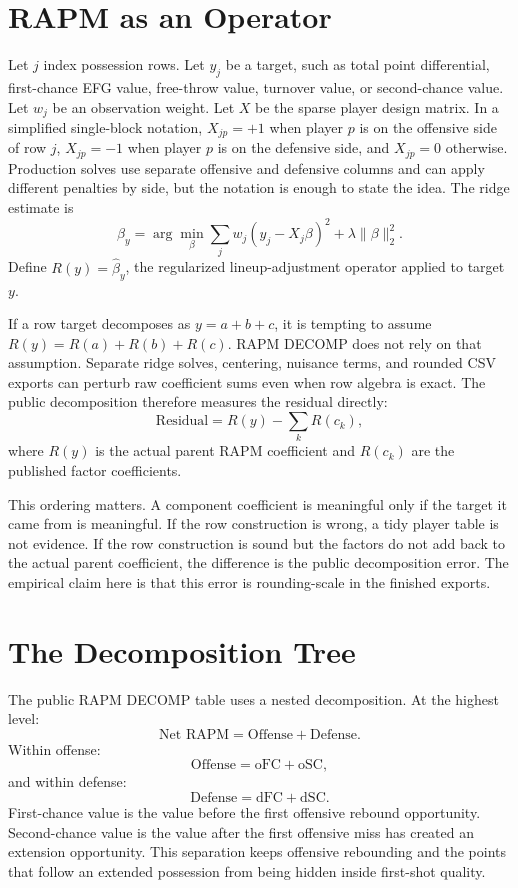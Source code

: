 \documentclass[11pt]{article}
\begin{document}
\section{RAPM as an Operator}

Let $j$ index possession rows.  Let $y_j$ be a target, such as total point
differential, first-chance EFG value, free-throw value, turnover value, or
second-chance value.  Let $w_j$ be an observation weight.  Let $X$ be the sparse
player design matrix.  In a simplified single-block notation, $X_{jp}=+1$ when
player $p$ is on the offensive side of row $j$, $X_{jp}=-1$ when player $p$ is
on the defensive side, and $X_{jp}=0$ otherwise.  Production solves use
separate offensive and defensive columns and can apply different penalties by
side, but the notation is enough to state the idea.  The ridge estimate is
\[
\hat{\beta}_y =
\arg\min_{\beta}
\sum_j w_j (y_j - X_j\beta)^2 + \lambda \|\beta\|_2^2 .
\]
Define $R(y)=\hat{\beta}_y$, the regularized lineup-adjustment operator applied
to target $y$.

If a row target decomposes as $y=a+b+c$, it is tempting to assume
$R(y)=R(a)+R(b)+R(c)$.  RAPM DECOMP does not rely on that assumption.  Separate
ridge solves, centering, nuisance terms, and rounded CSV exports can perturb raw
coefficient sums even when row algebra is exact.  The public decomposition
therefore measures the residual directly:
\[
\text{Residual} = R(y) - \sum_k R(c_k),
\]
where $R(y)$ is the actual parent RAPM coefficient and $R(c_k)$ are the
published factor coefficients.

This ordering matters.  A component coefficient is meaningful only if the
target it came from is meaningful.  If the row construction is wrong, a tidy
player table is not evidence.  If the row construction is sound but the factors
do not add back to the actual parent coefficient, the difference is the public
decomposition error.  The empirical claim here is that this error is
rounding-scale in the finished exports.

\section{The Decomposition Tree}

The public RAPM DECOMP table uses a nested decomposition.  At the highest level:
\[
\text{Net RAPM} = \text{Offense} + \text{Defense}.
\]
Within offense:
\[
\text{Offense} = \text{oFC} + \text{oSC},
\]
and within defense:
\[
\text{Defense} = \text{dFC} + \text{dSC}.
\]
First-chance value is the value before the first offensive rebound opportunity.
Second-chance value is the value after the first offensive miss has created an
extension opportunity.  This separation keeps offensive rebounding and the
points that follow an extended possession from being hidden inside first-shot
quality.
\end{document}
